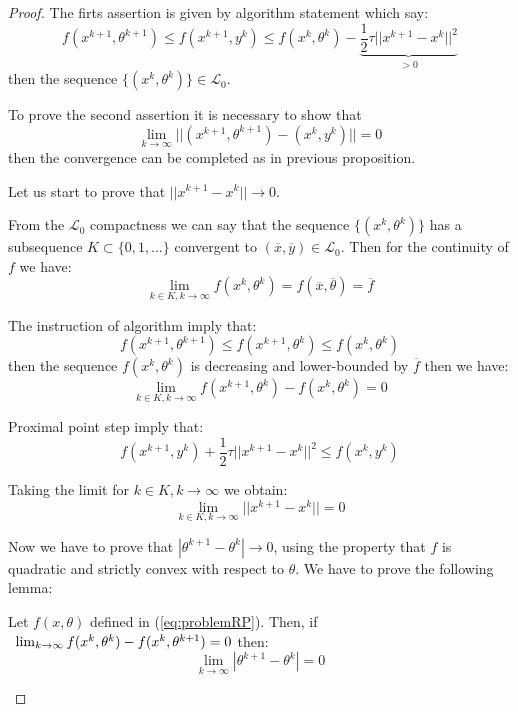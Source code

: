 \begin{proof}
The firts assertion is given by algorithm statement which say:
\begin{equation}
f(x^{k+1},\theta^{k+1})\le f(x^{k+1},y^k)\le f(x^k,\theta^k)- \underbrace{\frac{1}{2}\tau ||x^{k+1}-x^{k}||^2}_{>0}
\end{equation}
then the sequence $\{(x^k,\theta^k)\} \in \mathcal{L}_0$.

To prove the second assertion it is necessary to show that
\begin{equation}
\lim_{k \rightarrow \infty} ||(x^{k+1},\theta^{k+1})-(x^{k},y^{k})||=0
\end{equation}
then the convergence can be completed as in previous proposition.

Let us start to prove that $||x^{k+1}-x^{k}||\to0$.

From the $\mathcal{L}_0$ compactness we can say that the sequence $\{(x^k,\theta^k)\}$ has a subsequence $K \subset \{0,1,\ldots\}$ convergent to $(\overline{x},\overline{y}) \in \mathcal{L}_0$. Then for the continuity of $f$ we have:
\begin{equation}
\lim_{k \in K, k \rightarrow \infty}f(x^k,\theta^k)=f(\overline{x},\overline{\theta})= \overline{f}
\end{equation}

The instruction of algorithm imply that:
\begin{equation}
f(x^{k+1},\theta^{k+1})\le f(x^{k+1},\theta^{k})\le f(x^k,\theta^k)
\end{equation}
then the sequence $f(x^k,\theta^k)$ is decreasing and lower-bounded by $\overline{f}$ then we have:
\begin{equation}
\lim_{k \in K, k \rightarrow \infty} f(x^{k+1},\theta^{k})-f(x^{k},\theta^{k})=0
\end{equation}

Proximal point step imply that:
\begin{equation}
f(x^{k+1},y^{k})+\frac{1}{2}\tau||x^{k+1}-x^{k}||^2 \le f(x^{k},y^{k})
\end{equation}

Taking the limit for $k \in K, k \to \infty$ we obtain:
\begin{equation}
\lim_{k \in K,k \to \infty} ||x^{k+1}-x^{k}||=0
\end{equation}

Now we have to prove that $|\theta^{k+1}-\theta^{k}|\to 0$, using the property that $f$ is quadratic and strictly convex with respect to $\theta$. 
We have to prove the following lemma:
\begin{lemma}
Let $f(x, \theta)$ defined in (\ref{eq:problemRP}). Then, if $\enskip\lim_{k \to \infty} f(x^{k},\theta^k)-f(x^{k},\theta^{k+1})=0$ then:
\begin{equation}
 \lim_{k\to \infty} |\theta^{k+1} -\theta^k| = 0 
\end{equation}
\end{lemma}


\end{proof}
